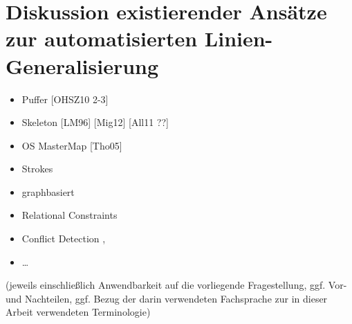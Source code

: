 \documentclass{../thesis}
\begin{document}
\section[Diskussion existierender Ansätze]{Diskussion existierender Ansätze zur automatisierten Linien-Generalisierung}

\begin{itemize}

	\item Puffer [OHSZ10 2-3]

	\item Skeleton [LM96] [Mig12] [All11 ??]


	\item OS MasterMap
	[Tho05]

	\item Strokes \cite{Tho06b, EM00}

	\item graphbasiert \cite{JC04, MM99, HAS05, TR95, Kne09}

	\item Relational Constraints \cite{TBDJRG12}

	\item Conflict Detection \cite{KP98}, \cite{Tho06a}

	\item …

\end{itemize}


(jeweils einschließlich Anwendbarkeit auf die vorliegende Fragestellung, ggf. Vor- und Nachteilen, ggf. Bezug der darin verwendeten Fachsprache zur in dieser Arbeit verwendeten Terminologie)


%
\end{document}
